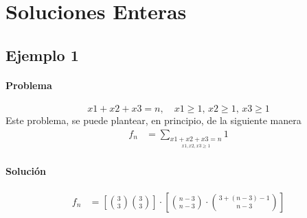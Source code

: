 \section{Soluciones Enteras}

\subsection{Ejemplo 1}
\paragraph{Problema}
$$x1+x2+x3=n,\quad x1\geq 1,\,x2\geq1,\,x3\geq1$$
Este problema, se puede plantear, en principio, de la siguiente manera
\begin{align*}
f_n&=\sum_{\underset{x1,x2,x3\geq1}{x1+x2+x3=n}}{1}
\end{align*}
\paragraph{Solución}
\begin{align*}
f_n&=\left[\binom{3}{3}\binom{3}{3}\right]\cdot\left[\binom{n-3}{n-3}\cdot\binom{3+(n-3)-1}{n-3}\right]
\end{align*}
